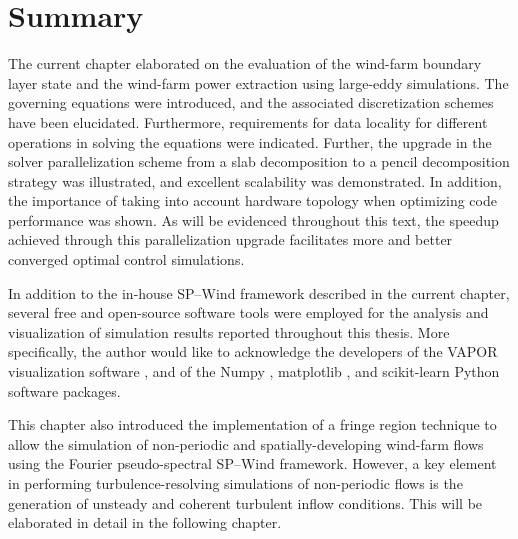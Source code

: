 \section{Summary}
The current chapter elaborated on the evaluation of the wind-farm boundary layer state and the wind-farm power extraction using large-eddy simulations. The governing equations were introduced, and the associated discretization schemes have been elucidated. Furthermore, requirements for data locality for different operations in solving the equations were indicated. Further, the upgrade in the solver parallelization scheme from a slab decomposition to a pencil decomposition strategy was illustrated, and excellent scalability was demonstrated. In addition, the importance of taking into account hardware topology when optimizing code performance was shown.  As will be evidenced throughout this text, the speedup achieved through this parallelization upgrade facilitates more and better converged optimal control simulations. 

In addition to the in-house SP--Wind framework described in the current chapter, several free and open-source software tools were employed for the analysis and visualization of simulation results reported throughout this thesis. More specifically, the author would like to acknowledge the developers of the VAPOR visualization software \citep{vapor}, and of the Numpy \citep{numpy}, matplotlib \citep{matplotlib}, and scikit-learn \citep{scikit-learn} Python software packages. 

This chapter also introduced the implementation of a fringe region technique to allow the simulation of non-periodic and spatially-developing wind-farm flows using the Fourier pseudo-spectral SP--Wind framework. However, a key element in performing turbulence-resolving simulations of non-periodic flows is the generation of unsteady and coherent turbulent inflow conditions. This will be elaborated in detail in the following chapter. 

\cleardoublepage

